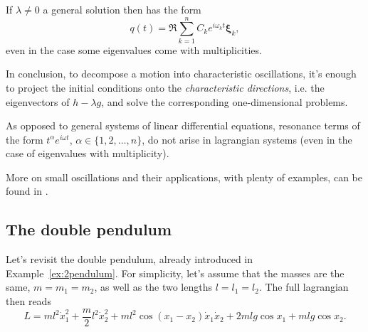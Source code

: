 \documentclass[english,fontsize=11pt,paper=a5,oneside]{scrbook}
\theoremstyle{definition}
\newenvironment{remark}
  {\pushQED{\qed}\renewcommand{\qedsymbol}{$\lozenge$}\remarkx}
  {\popQED\endremarkx}
\begin{document}
If $\lambda\neq 0$ a general solution then has the form
\begin{equation}
    q(t) = \Re \sum_{k=1}^n C_k e^{i \omega_k t}\bm{\xi}_k,
\end{equation}
even in the case some eigenvalues come with multiplicities.

In conclusion, to decompose a motion into characteristic oscillations, it's enough to project the initial conditions onto the \emph{characteristic directions}, i.e. the eigenvectors of $h - \lambda g$, and solve the corresponding one-dimensional problems.

\begin{remark}
    As opposed to general systems of linear differential equations, resonance terms of the form $t^\alpha e^{i \omega t}$, $\alpha\in\big\{1,2,\ldots,n\big\}$, do not arise in lagrangian systems (even in the case of eigenvalues with multiplicity).
\end{remark}

More on small oscillations and their applications, with plenty of examples, can be found in \cite[Chapters 23--25]{book:arnold}.

\subsection{The double pendulum}
Let's revisit the double pendulum, already introduced in Example~\ref{ex:2pendulum}.
For simplicity, let's assume that the masses are the same, $m = m_1 = m_2$, as well as the two lengths $l = l_1 = l_2$. 
The full lagrangian then reads
\begin{equation}
        L = m l^2 \dot x_1^2
             + \frac m2 l^2 \dot x_2^2
             + m l^2 \cos(x_1 -x_2)\dot x_1 \dot x_2
             + 2ml g \cos x_1
             + mlg\cos x_2.
\end{equation}
\end{document}
